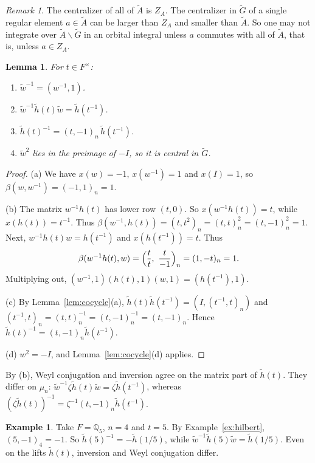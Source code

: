 \documentclass[12pt,letterpaper]{article}
\numberwithin{equation}{section}
\theoremstyle{plain}
\newtheorem{lemma}[theorem]{Lemma}
\theoremstyle{definition}
\newtheorem{example}[theorem]{Example}
\theoremstyle{remark}
\newtheorem{remark}[theorem]{Remark}
\newcommand{\Gt}{\widetilde G}
\newcommand{\At}{\widetilde A}
\newcommand{\hl}{\tilde h}
\newcommand{\wt}{\tilde w}
\newcommand{\Qq}{\mathbb Q}
\newcommand{\ZA}{Z_A}
\begin{document}
\begin{remark}\label{rem:centralizer}
The centralizer of all of $\At$ is $\ZA$. The centralizer in $\Gt$ of
a single regular element $a\in\At$ can be larger than $\ZA$ and
smaller than $\At$. So one may not integrate over $\At\backslash\Gt$
in an orbital integral unless $a$ commutes with all of $\At$, that is,
unless $a\in\ZA$.
\end{remark}

\begin{lemma}\label{lem:weyl-torus}
For $t\in F^\times$:
\begin{enumerate}[label=(\alph*)]
\item $\wt^{-1}=(w^{-1},1)$.
\item $\wt^{-1}\hl(t)\wt=\hl(t^{-1})$.
\item $\hl(t)^{-1}=(t,-1)_n\,\hl(t^{-1})$.
\item $\wt^2$ lies in the preimage of $-I$, so it is central in $\Gt$.
\end{enumerate}
\end{lemma}

\begin{proof}
(a) We have $x(w)=-1$, $x(w^{-1})=1$ and $x(I)=1$, so
$\beta(w,w^{-1})=(-1,1)_n=1$.

(b) The matrix $w^{-1}h(t)$ has lower row $(t,0)$. So
$x(w^{-1}h(t))=t$, while $x(h(t))=t^{-1}$. Thus
$\beta(w^{-1},h(t))=(t,t^2)_n=(t,t)_n^2=(t,-1)_n^2=1$. Next,
$w^{-1}h(t)w=h(t^{-1})$ and $x(h(t^{-1}))=t$. Thus
\[
\beta(w^{-1}h(t),w)=\Bigl(\frac tt,\ \frac t{-1}\Bigr)_n=(1,-t)_n=1 .
\]
Multiplying out,
$(w^{-1},1)(h(t),1)(w,1)=(h(t^{-1}),1)$.

(c) By Lemma~\ref{lem:cocycle}(a), $\hl(t)\hl(t^{-1})=(I,(t^{-1},t)_n)$
and $(t^{-1},t)_n=(t,t)_n^{-1}=(t,-1)_n^{-1}=(t,-1)_n$. Hence
$\hl(t)^{-1}=(t,-1)_n\hl(t^{-1})$.

(d) $w^2=-I$, and Lemma~\ref{lem:cocycle}(d) applies.
\end{proof}

By (b), Weyl conjugation and inversion agree on the matrix part of
$\hl(t)$. They differ on $\mu_n$: $\wt^{-1}\zeta\hl(t)\wt=\zeta\hl(t^{-1})$,
whereas $(\zeta\hl(t))^{-1}=\zeta^{-1}(t,-1)_n\hl(t^{-1})$.

\begin{example}\label{ex:inverse}
Take $F=\Qq_5$, $n=4$ and $t=5$. By Example~\ref{ex:hilbert},
$(5,-1)_4=-1$. So $\hl(5)^{-1}=-\hl(1/5)$, while
$\wt^{-1}\hl(5)\wt=\hl(1/5)$. Even on the lifts $\hl(t)$, inversion
and Weyl conjugation differ.
\end{example}
\end{document}
